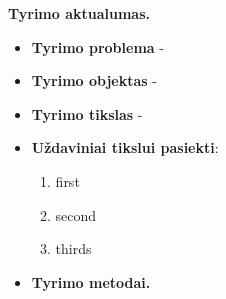 
\mytab\textbf{Tyrimo aktualumas.}


\begin{itemize}[label={}]
    \item \textbf{Tyrimo problema} - 
    \item \textbf{Tyrimo objektas} - 
    \item \textbf{Tyrimo tikslas} - 
    \item \textbf{Uždaviniai tikslui pasiekti}:
    \begin{enumerate}
        \item first
        \item second
        \item thirds
    \end{enumerate}
    \item \textbf{Tyrimo metodai.}
\end{itemize}


